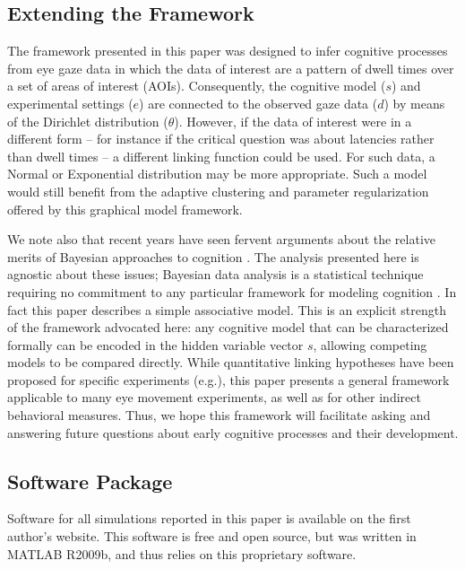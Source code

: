 \documentclass[12pt]{article}
\begin{document}
\subsection*{Extending the Framework}

	The framework presented in this paper was designed to infer cognitive processes from eye gaze data in which the data of interest are a pattern of dwell times over a set of areas of interest (AOIs). Consequently, the cognitive model ($s$) and experimental settings ($e$) are connected to the observed gaze data ($d$) by means of the Dirichlet distribution ($\theta$). However, if the data of interest were in a different form -- for instance if the critical question was about latencies rather than dwell times -- a different linking function could be used. For such data, a Normal or Exponential distribution may be more appropriate. Such a model would still benefit from the adaptive clustering and parameter regularization offered by this graphical model framework.

	We note also that recent years have seen fervent arguments about the relative merits of Bayesian approaches to cognition \cite{McClelland2010, Griffiths2010, Jones2011}. The analysis presented here is agnostic about these issues; Bayesian data analysis is a statistical technique requiring no commitment to any particular framework for modeling cognition \cite{Kruschke2010a, Kruschke2011}. In fact this paper describes a simple associative model. This is an explicit strength of the framework advocated here: any cognitive model that can be characterized formally can be encoded in the hidden variable vector $s$, allowing competing models to be compared directly.  While quantitative linking hypotheses have been proposed for specific experiments (e.g.\cite{Yu2011a, Gilmore2002}), this paper presents a general framework applicable to many eye movement experiments, as well as for other indirect behavioral measures. Thus, we hope this framework will facilitate asking and answering future questions about early cognitive processes and their development.

\subsection*{Software Package}

	Software for all simulations reported in this paper is available on the first author's website. This software is free and open source, but was written in MATLAB R2009b, and thus relies on this proprietary software. 
\end{document}
